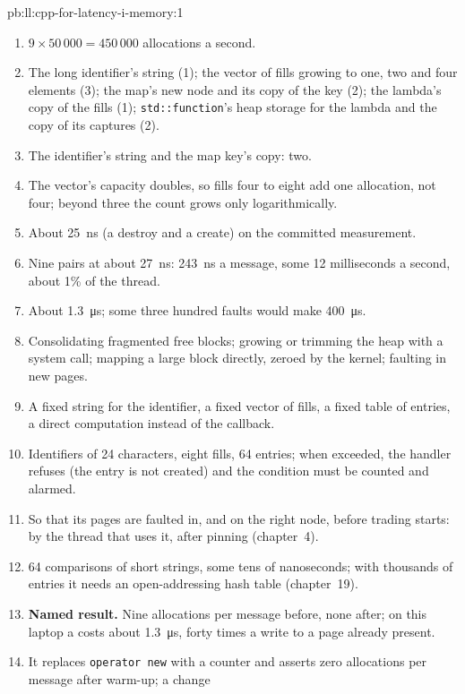 \begin{solution}{pb:ll:cpp-for-latency-i-memory:1}
\begin{enumerate}
\item $9 \times 50\,000 = 450\,000$ allocations a second.
\item The long identifier's string (1); the vector of fills growing to one, two and four elements (3); the map's new node
and its copy of the key (2); the lambda's copy of the fills (1); \texttt{std::function}'s heap storage for the lambda and
the copy of its captures (2).
\item The identifier's string and the map key's copy: two.
\item The vector's capacity doubles, so fills four to eight add one allocation, not four; beyond three the count grows
only logarithmically.
\item About \qty{25}{\nano\second} (a destroy and a create) on the committed measurement.
\item Nine pairs at about \qty{27}{\nano\second}: \qty{243}{\nano\second} a message, some 12 milliseconds a second, about
1\% of the thread.
\item About \qty{1.3}{\micro\second}; some three hundred faults would make \qty{400}{\micro\second}.
\item Consolidating fragmented free blocks; growing or trimming the heap with a system call; mapping a large block
directly, zeroed by the kernel; faulting in new pages.
\item A fixed string for the identifier, a fixed vector of fills, a fixed table of entries, a direct computation instead
of the callback.
\item Identifiers of 24 characters, eight fills, 64 entries; when exceeded, the handler refuses (the entry is not created)
and the condition must be counted and alarmed.
\item So that its pages are faulted in, and on the right node, before trading starts: by the thread that uses it, after
pinning (chapter~4).
\item 64 comparisons of short strings, some tens of nanoseconds; with thousands of entries it needs an open-addressing
hash table (chapter~19).
\item \textbf{Named result.} Nine allocations per message before, none after; on this laptop a  costs about
\qty{1.3}{\micro\second}, forty times a write to a page already present.
\item It replaces \texttt{operator new} with a counter and asserts zero allocations per message after warm-up; a change

\end{enumerate}
\end{solution}
